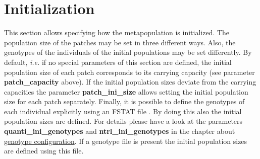 \documentclass[letterpaper,12pt,oneside]{book}
\begin{document}
\section{Initialization}
This section allows specifying how the metapopulation is initialized. The population size of the patches may be set in three different ways. Also, the genotypes of the individuals of the initial populations may be set differently. By default, \textit{i.e.} if no special parameters of this section are defined, the initial population size of each patch corresponds to its carrying capacity (see parameter \textbf{patch\_capacity} above). If the initial population sizes deviate from the carrying capacities the parameter \textbf{patch\_ini\_size} allows setting the initial population size for each patch separately. Finally, it is possible to define the genotypes of each individual explicitly using an FSTAT file \citep{Goudet_1995}. By doing this also the initial population sizes are defined. For details please have a look at the parameters \textbf{quanti\_ini\_genotypes} and \textbf{ntrl\_ini\_genotypes} in the chapter about \hyperref[chap:GenotypeConfiguration]{genotype configuration}. If a genotype file is present the initial population sizes are defined using this file.
\end{document}
